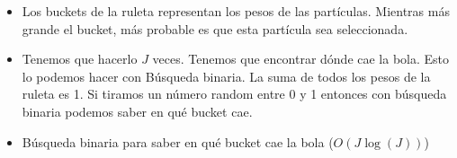\begin{frame}
\begin{overlayarea}{\textwidth}{\textheight}
\begin{itemize}
            \item Los buckets de la ruleta representan los pesos de las partículas. Mientras más grande el bucket, más probable es que esta partícula sea seleccionada.
            \item Tenemos que hacerlo $J$ veces. Tenemos que encontrar dónde cae la bola. Esto lo podemos hacer con Búsqueda binaria. La suma de todos los pesos de la ruleta es 1. Si tiramos un número random entre 0 y 1 entonces con búsqueda binaria podemos saber en qué bucket cae.
            \item Búsqueda binaria para saber en qué bucket cae la bola ($O(J \log(J))$)
        \end{itemize}

    \end{overlayarea}

\end{frame}

